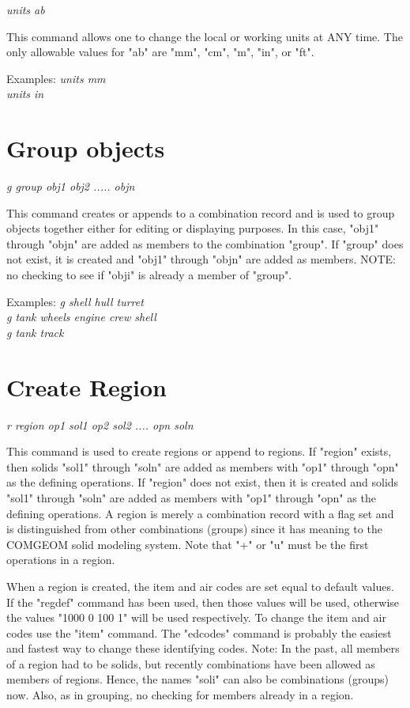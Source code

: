 {\em \center units ab}

This command allows one to change the local or working units at ANY time.
The only allowable values for "ab" are "mm", "cm", "m", "in", or "ft".

Examples:
{\em
           units mm \\
           units in \\
}

\section{Group objects}

{\em \center g group obj1 obj2 ..... objn}

This command creates or appends to a combination record and
is used to group objects together either for editing or displaying
purposes.  In this case, "obj1" through "objn" are added as members
to the combination "group".  If "group" does not exist, it is
created and "obj1" through "objn" are added as members.
NOTE: no checking to see if "obji" is already a member of "group".

Examples:
{\em
            g shell hull turret \\
            g tank wheels engine crew shell \\
            g tank track \\
}

\section{Create Region}

{\em \center
r region op1 sol1 op2 sol2 .... opn soln
}

This command is used to create regions or append to regions.
If "region" exists, then solids "sol1" through "soln" are
added as members with "op1" through "opn" as the defining operations.
If "region" does not exist, then it is created and solids "sol1" through
"soln" are added as members with "op1" through "opn" as the
defining operations.  A region is merely a combination
record with a flag set and is distinguished from other combinations (groups)
since it has meaning to the COMGEOM solid modeling system.
Note that "+" or "u" must be the first operations in a region.

When a region is created, the item and air codes are set equal to default values.
If the "regdef" command has been used, then those values will be used,
otherwise the values "1000 0 100 1" will be used respectively.
To change
the item and air codes use the "item" command.
The "edcodes" command is probably the easiest and fastest way to change these
identifying codes.
Note:  In the past, all members of a region had to be solids, but
recently combinations have been allowed as members of regions.  Hence,
the names "soli" can also be combinations (groups) now.
Also, as in grouping, no checking for members already in a region.

